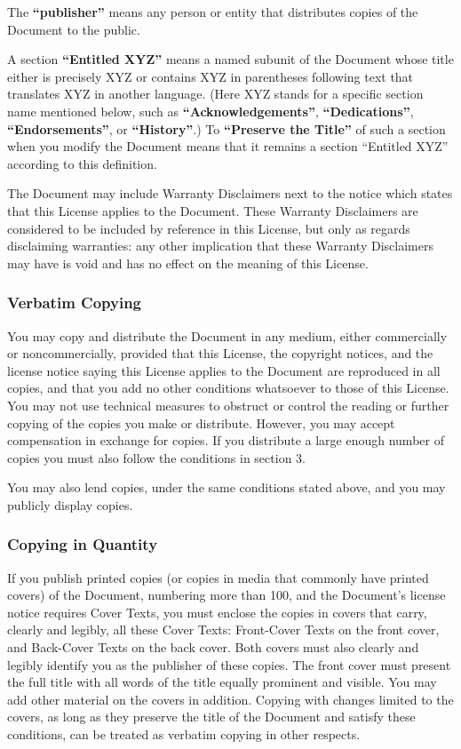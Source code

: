 The \textbf{``publisher''} means any person or entity that distributes copies of the Document to the public.

A section \textbf{``Entitled XYZ''} means a named subunit of the Document whose title either is precisely XYZ or contains XYZ in parentheses following text that translates XYZ in another language. (Here XYZ stands for a specific section name mentioned below, such as \textbf{``Acknowledgements''}, \textbf{``Dedications''}, \textbf{``Endorsements''}, or \textbf{``History''}.) To \textbf{``Preserve the Title''} of such a section when you modify the Document means that it remains a section ``Entitled XYZ'' according to this definition.

The Document may include Warranty Disclaimers next to the notice which states that this License applies to the Document. These Warranty Disclaimers are considered to be included by reference in this License, but only as regards disclaiming warranties: any other implication that these Warranty Disclaimers may have is void and has no effect on the meaning of this License.

\subsubsection{Verbatim Copying}

You may copy and distribute the Document in any medium, either commercially or noncommercially, provided that this License, the copyright notices, and the license notice saying this License applies to the Document are reproduced in all copies, and that you add no other conditions whatsoever to those of this License. You may not use technical measures to obstruct or control the reading or further copying of the copies you make or distribute. However, you may accept compensation in exchange for copies. If you distribute a large enough number of copies you must also follow the conditions in section 3.

You may also lend copies, under the same conditions stated above, and you may publicly display copies.

\subsubsection{Copying in Quantity}

If you publish printed copies (or copies in media that commonly have printed covers) of the Document, numbering more than 100, and the Document's license notice requires Cover Texts, you must enclose the copies in covers that carry, clearly and legibly, all these Cover Texts: Front-Cover Texts on the front cover, and Back-Cover Texts on the back cover. Both covers must also clearly and legibly identify you as the publisher of these copies. The front cover must present the full title with all words of the title equally prominent and visible. You may add other material on the covers in addition. Copying with changes limited to the covers, as long as they preserve the title of the Document and satisfy these conditions, can be treated as verbatim copying in other respects.

